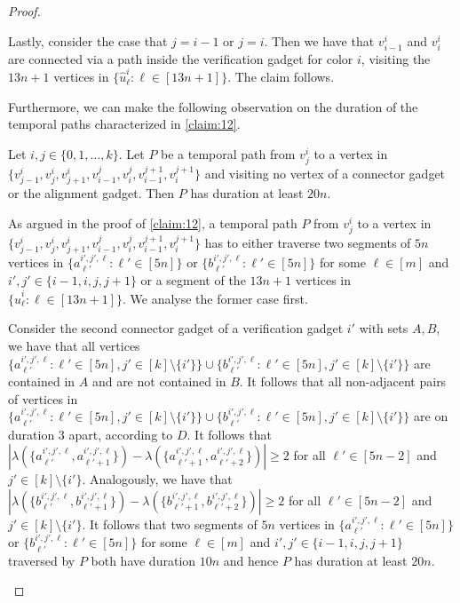\documentclass[a4paper,UKenglish,cleveref, autoref, thm-restate, anonymous]{lipics-v2021}
\begin{document}
\begin{proof}
\begin{claimproof}
    Lastly, consider the case that $j=i-1$ or $j=i$. Then we have that $v^i_{i-1}$ and $v^i_i$ are connected via a path inside the verification gadget for color $i$, visiting the $13n+1$ vertices in $\{\hat{u}^i_\ell :  \ell\in[13n+1]\}$. The claim follows.
\end{claimproof}
Furthermore, we can make the following observation on the duration of the temporal paths characterized in \cref{claim:12}.
\begin{claim}\label{claim:13}
    Let $i,j\in\{0,1,\ldots,k\}$. Let $P$ be a temporal path from $v^i_j$ to a vertex in $\{v^i_{j-1},v^i_j,v^i_{j+1},v^j_{i-1},v^j_i,v^{j+1}_{i-1},v^{j+1}_i\}$ and visiting no vertex of a connector gadget or the alignment gadget. Then $P$ has duration at least $20n$.
\end{claim}
\begin{claimproof}
    As argued in the proof of \cref{claim:12}, a temporal path $P$ from $v^i_j$ to a vertex in $\{v^i_{j-1},v^i_j,v^i_{j+1},v^j_{i-1},v^j_i,v^{j+1}_{i-1},v^{j+1}_i\}$ has to either traverse two segments of $5n$ vertices in $\{a^{i',j',\ell}_{\ell'} :  \ell'\in[5n]\}$ or $\{b^{i',j',\ell}_{\ell'} :  \ell'\in[5n]\}$ for some $\ell\in[m]$ and $i',j'\in\{i-1,i,j,j+1\}$ or a segment of the $13n+1$ vertices in $\{\hat{u}^i_\ell :  \ell\in[13n+1]\}$. We analyse the former case first.
    
    Consider the second connector gadget of a verification gadget $i'$ with sets $A,B$, we have that all vertices $\{a^{i',j',\ell}_{\ell'} :  \ell'\in[5n],j'\in[k]\setminus\{i'\}\}\cup\{b^{i',j',\ell}_{\ell'} :  \ell'\in[5n],j'\in[k]\setminus\{i'\}\}$ are contained in $A$ and are not contained in $B$. It follows that all non-adjacent pairs of vertices in $\{a^{i',j',\ell}_{\ell'} :  \ell'\in[5n],j'\in[k]\setminus\{i'\}\}\cup\{b^{i',j',\ell}_{\ell'} :  \ell'\in[5n],j'\in[k]\setminus\{i'\}\}$ are on duration $3$ apart, according to $D$. It follows that $|\lambda(\{a^{i',j',\ell}_{\ell'},a^{i',j',\ell}_{\ell'+1}\})-\lambda(\{a^{i',j',\ell}_{\ell'+1},a^{i',j',\ell}_{\ell'+2}\})|\ge 2$ for all $\ell'\in[5n-2]$ and $j'\in[k]\setminus\{i'\}$. Analogously, we have that $|\lambda(\{b^{i',j',\ell}_{\ell'},b^{i',j',\ell}_{\ell'+1}\})-\lambda(\{b^{i',j',\ell}_{\ell'+1},b^{i',j',\ell}_{\ell'+2}\})|\ge 2$ for all $\ell'\in[5n-2]$ and $j'\in[k]\setminus\{i'\}$. It follows that two segments of $5n$ vertices in $\{a^{i',j',\ell}_{\ell'} :  \ell'\in[5n]\}$ or $\{b^{i',j',\ell}_{\ell'} :  \ell'\in[5n]\}$ for some $\ell\in[m]$ and $i',j'\in\{i-1,i,j,j+1\}$ traversed by $P$ both have duration $10n$ and hence $P$ has duration at least $20n$.


\end{claimproof}
\end{proof}
\end{document}
